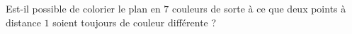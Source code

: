Est-il possible de colorier le plan en $7$ couleurs de sorte à ce que deux points à distance $1$ soient toujours de couleur différente ?